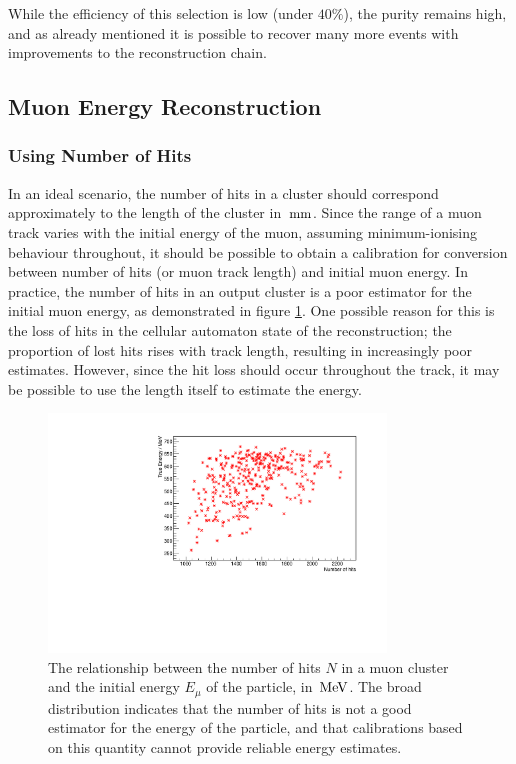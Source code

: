 While the efficiency of this selection is low (under $40\%$), the purity remains high, and as already mentioned it is possible to recover many more events with improvements to the reconstruction chain.

\subsection{Muon Energy Reconstruction}
\subsubsection{Using Number of Hits}
In an ideal scenario, the number of hits in a cluster should correspond approximately to the length of the cluster in $\,\mathrm{mm}$. Since the range of a muon track varies with the initial energy of the muon, assuming minimum-ionising behaviour throughout, it should be possible to obtain a calibration for conversion between number of hits (or muon track length) and initial muon energy. In practice, the number of hits in an output cluster is a poor estimator for the initial muon energy, as demonstrated in figure \ref{fig:ccqe-770-e-nhits-calib}. One possible reason for this is the loss of hits in the cellular automaton state of the reconstruction; the proportion of lost hits rises with track length, resulting in increasingly poor estimates. However, since the hit loss should occur throughout the track, it may be possible to use the length itself to estimate the energy.

\begin{figure}
    \centering
    \includegraphics[angle=-90,width=0.8\textwidth]{chapters/analysis_images/ccqe-770-e-nhits-calib}
    \caption[Relationship between number of hits and energy]{\label{fig:ccqe-770-e-nhits-calib}The relationship between the number of hits $N$ in a muon cluster and the initial energy $E_\mu$ of the particle, in $\,\mathrm{MeV}$. The broad distribution indicates that the number of hits is not a good estimator for the energy of the particle, and that calibrations based on this quantity cannot provide reliable energy estimates.}
\end{figure}

